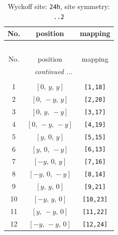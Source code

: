 \documentclass[fleqn,8pt]{jsarticle}
\begin{document}
\begin{longtable}{ccc}
\caption{Wyckoff site: {\tt 24h}, site symmetry: {\tt ..2}}
 \\
 \hline \hline
No. & position & mapping \\ \hline \endfirsthead

\multicolumn{2}{l}{\tablename\ \thetable{}} \\
 \hline \hline
No. & position & mapping \\ \hline \endhead

 \hline \hline
\multicolumn{2}{r}{\footnotesize\it continued ...} \\ \endfoot

 \hline \hline
\multicolumn{2}{r}{} \\ \endlastfoot

1 & $\left[ 0,\, y,\, y \right]$ & {\tt [1,18]} \\ \hline
2 & $\left[ 0,\, - y,\, y \right]$ & {\tt [2,20]} \\ \hline
3 & $\left[ 0,\, y,\, - y \right]$ & {\tt [3,17]} \\ \hline
4 & $\left[ 0,\, - y,\, - y \right]$ & {\tt [4,19]} \\ \hline
5 & $\left[ y,\, 0,\, y \right]$ & {\tt [5,15]} \\ \hline
6 & $\left[ y,\, 0,\, - y \right]$ & {\tt [6,13]} \\ \hline
7 & $\left[ - y,\, 0,\, y \right]$ & {\tt [7,16]} \\ \hline
8 & $\left[ - y,\, 0,\, - y \right]$ & {\tt [8,14]} \\ \hline
9 & $\left[ y,\, y,\, 0 \right]$ & {\tt [9,21]} \\ \hline
10 & $\left[ - y,\, y,\, 0 \right]$ & {\tt [10,23]} \\ \hline
11 & $\left[ y,\, - y,\, 0 \right]$ & {\tt [11,22]} \\ \hline
12 & $\left[ - y,\, - y,\, 0 \right]$ & {\tt [12,24]} \\
\end{longtable}
\renewcommand{\arraystretch}{1.2}
\end{document}
